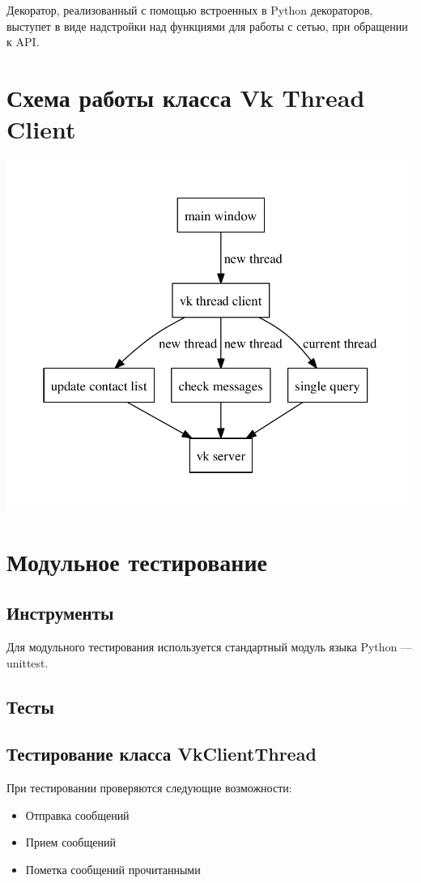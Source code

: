 \documentclass[12pt]{article}
\begin{document}
Декоратор, реализованный с помощью встроенных в Python декораторов, выступет в виде надстройки над функциями для работы с сетью, 
при обращении к API.

\section{Схема работы класса Vk Thread Client}
\includegraphics{./diag/work_logic.pdf}

\newpage
\section{Модульное тестирование}
\subsection{Инструменты}

Для модульного тестирования используется стандартный модуль языка Python --- unittest.

\subsection{Тесты}

\subsection{Тестирование класса VkClientThread}
При тестировании проверяются следующие возможности:
\begin{itemize}
\setlength{\itemsep}{-1mm}
\item Отправка сообщений
\item Прием сообщений
\item Пометка сообщений прочитанными
\end{itemize}
\end{document}

